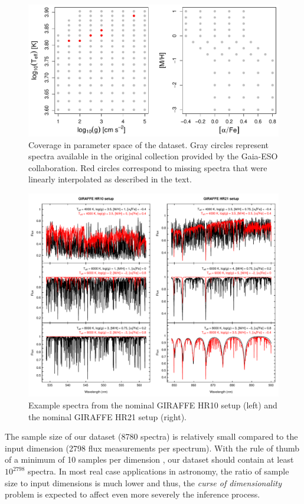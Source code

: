 \documentclass[a4paper,fleqn,usenatbib]{mnras}
\begin{document}
\begin{figure}
	\centering\includegraphics[width=\columnwidth]{fig01_grid_modelos.pdf}
	\caption{Coverage in parameter space of the dataset. Gray circles 
		represent spectra available in the original collection provided 
		by the Gaia-ESO collaboration. Red circles correspond to missing 
		spectra that were linearly interpolated as described in the text.}
	\label{fig:gridModelos}
\end{figure}

\begin{figure}
	\centering\includegraphics[width=\textwidth]{fig02_espectros_HR10_HR21.pdf}
	\caption{Example spectra from the nominal GIRAFFE 
		HR10 setup (left) and the nominal GIRAFFE HR21 setup (right).}
	\label{fig:ejemplosEspectros}
\end{figure}

The sample size of our dataset (8780 spectra) is relatively
small compared to the input dimension (2798 flux measurements 
per spectrum). With the rule of thumb of a minimum of 10 samples per dimension  
	\citep{jain:00}, our dataset should contain at least $10^{2798}$ spectra.
In most real case applications in astronomy, the ratio of sample size to input 
dimensions is much lower and thus, the \textit{curse of dimensionality} 
problem is expected to affect even more severely the inference process. 
\end{document}
